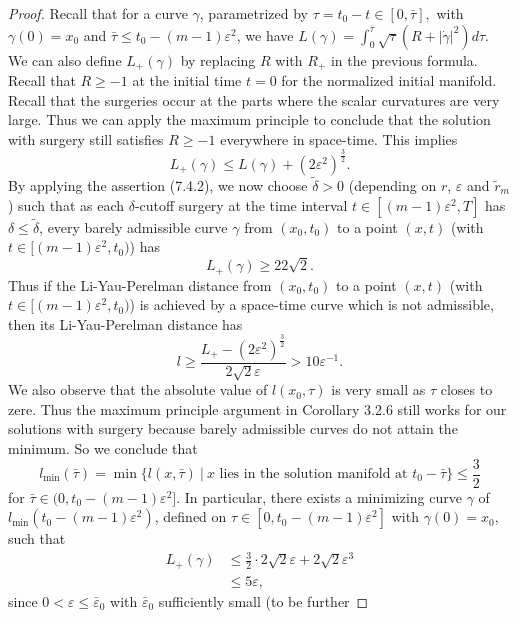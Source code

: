 \begin{proof}
Recall that for a curve $\gamma$, parametrized by
$\tau=t_0-t\in[0,\bar{\tau}],$ with $\gamma(0)=x_0$ and
$\bar{\tau}\leq t_0-(m-1)\varepsilon^2$, we have
$L(\gamma)=\int^{\bar{\tau}}_0\sqrt{\tau}(R+|\dot{\gamma}|^2)d\tau$.
We can also define $L_+(\gamma)$ by replacing $R$ with $R_+$ in
the previous formula. Recall that $R\geq-1$ at the initial time
$t=0$ for the normalized initial manifold. Recall that the
surgeries occur at the parts where the scalar curvatures are very
large. Thus we can apply the maximum principle to conclude that
the solution with surgery still satisfies $R\geq -1$  everywhere
in space-time. This implies \begin{equation} L_+(\gamma)\leq
L(\gamma)+(2\varepsilon^2)^{\frac{3}{2}}.
\end{equation} By applying the assertion (7.4.2), we now choose
$\tilde{\delta}>0$ (depending on $r$, $\varepsilon$ and
$\widetilde{r}_m$) such that as each $\delta$-cutoff surgery at
the time interval $t\in[(m-1)\varepsilon^2,T]$ has $\delta \leq
\tilde{\delta}$, every barely admissible curve $\gamma$ from
$(x_0,t_0)$ to a point $(x,t)$ (with
$t\in[(m-1)\varepsilon^2,t_0)$) has
$$
L_+(\gamma)\geq22\sqrt{2}.
$$
Thus if the Li-Yau-Perelman distance from $(x_0,t_0)$ to a point
$(x,t)$ (with $t\in[(m-1)\varepsilon^2,t_0)$) is achieved by a
space-time curve which is not admissible, then its Li-Yau-Perelman
distance has \begin{equation}
l\geq\frac{L_+-(2\varepsilon^2)^\frac{3}{2}}{2\sqrt{2}
\varepsilon}>10\varepsilon^{-1}. %
\end{equation} We also observe that the absolute value of $l(x_0,\tau)$ is
very small as $\tau$ closes to zere. Thus the maximum principle
argument in Corollary 3.2.6 still works for our solutions with
surgery because barely admissible curves do not attain the
minimum. So we conclude that
$$
l_{\min}(\bar{\tau})=\min\{l(x,\bar{\tau})\ |\ x \mbox{ lies in
the solution manifold at }t_0-\bar{\tau}\} \leq\frac{3}{2}
$$
for $\bar{\tau}\in(0,t_0-(m-1)\varepsilon^2]$. In particular,
there exists a minimizing curve $\gamma$ of
$l_{\min}(t_0-(m-1)\varepsilon^2)$, defined on
$\tau\in[0,t_0-(m-1)\varepsilon^2]$ with $\gamma(0)=x_0$, such
that
\begin{align}
L_+(\gamma)
& \leq \frac{3}{2}\cdot2\sqrt{2}\varepsilon+2\sqrt{2}\varepsilon^3\\
&  \leq 5\varepsilon, \nonumber
\end{align}  %
since $0<\varepsilon \leq \bar{\varepsilon}_0$ with
$\bar{\varepsilon}_0$ sufficiently small (to be further

\end{proof}
